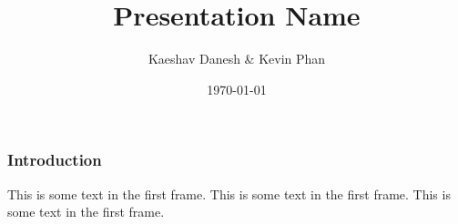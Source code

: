 \documentclass{beamer}
\title[Presentation Name]{Presentation Name}
\author[Kaeshav Danesh and Kevin Phan]{Kaeshav Danesh \& Kevin Phan}
\date{\today}
\begin{document}
\frame{\titlepage}

\begin{frame}
\frametitle{Introduction}
This is some text in the first frame. This is some text in the first frame. This is some text in the first frame. 
\end{frame}
\end{document}
